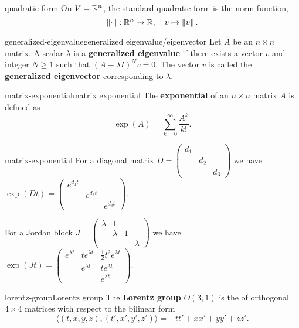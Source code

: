 \begin{example}{quadratic-form}
    On $V = \mathbb{R}^n$, the standard quadratic form is the norm-function,
    \[ \left\|\cdot\right\| : \mathbb{R}^n \to \mathbb{R}, \quad v \mapsto \left\|v\right\| . \]
\end{example}

\begin{topic}{generalized-eigenvalue}{generalized eigenvalue/eigenvector}
    Let $A$ be an $n \times n$ matrix. A scalar $\lambda$ is a \textbf{generalized eigenvalue} if there exists a vector $v$ and integer $N \ge 1$ such that $(A - \lambda I)^N v = 0$. The vector $v$ is called the \textbf{generalized eigenvector} corresponding to $\lambda$.
\end{topic}

\begin{topic}{matrix-exponential}{matrix exponential}
    The \textbf{exponential} of an $n \times n$ matrix $A$ is defined as
    \[ \exp(A) = \sum_{k = 0}^{\infty} \frac{A^k}{k!} . \]
\end{topic}

\begin{example}{matrix-exponential}
    For a diagonal matrix $D = \begin{pmatrix} d_1 & & \\ & d_2 & \\ & & d_3 \end{pmatrix}$ we have $\exp(D t) = \begin{pmatrix} e^{d_1 t} & & \\ & e^{d_2 t} & \\ & & e^{d_3 t} \end{pmatrix}$.
    
    For a Jordan block $J = \begin{pmatrix} \lambda & 1 & \\ & \lambda & 1 \\ & & & \lambda \end{pmatrix}$ we have $\exp(J t) = \begin{pmatrix} e^{\lambda t} & t e^{\lambda t} & \tfrac{1}{2} t^2 e^{\lambda t} \\ & e^{\lambda t} & t e^{\lambda t} \\ & & e^{\lambda t} \end{pmatrix}$.
\end{example}

\begin{topic}{lorentz-group}{Lorentz group}
    The \textbf{Lorentz group} $O(3, 1)$ is the  of orthogonal $4 \times 4$ matrices with respect to the bilinear form
    \[ \langle (t, x, y, z), (t', x', y', z') \rangle = - tt' + xx' + yy' + zz' . \]
\end{topic}

